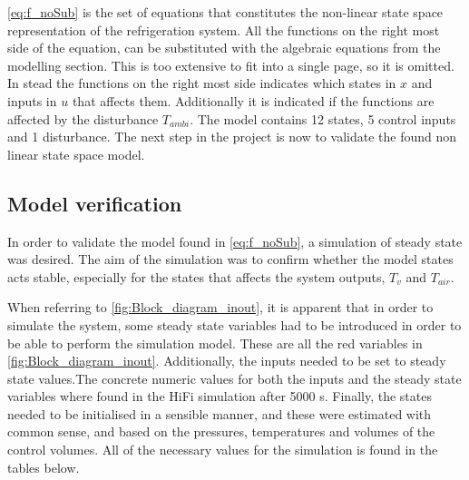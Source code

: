 \cref{eq:f_noSub} is the set of equations that constitutes the non-linear state space representation of the refrigeration system. All the functions on the right most side of the equation, can be substituted with the algebraic equations from the modelling section. This is too extensive to fit into a single page, so it is omitted. In stead the functions on the right most side indicates which states in $ x $ and inputs in $ u $ that affects them. Additionally it is indicated if the functions are affected by the disturbance $ T_{ambi} $. The model contains 12 states, 5 control inputs and 1 disturbance. The next step in the project is now to validate the found non linear state space model.

\newpage
\subsection{Model verification}\label{sec:model-verification}
In order to validate the model found in \cref{eq:f_noSub}, a simulation of steady state was desired. The aim of the simulation was to confirm whether the model states acts stable, especially for the states that affects the system outputs, $T_v$ and $T_{air}$.

When referring to \cref{fig:Block_diagram_inout}, it is apparent that in order to simulate the system, some steady state variables had to be introduced in order to be able to perform the simulation model. These are all the red variables in \cref{fig:Block_diagram_inout}. Additionally, the inputs needed to be set to steady state values.The concrete numeric values for both the inputs and the steady state variables where found in the HiFi simulation after 5000 s. Finally, the states needed to be initialised in a sensible manner, and these were estimated with common sense, and based on the pressures, temperatures and volumes of the control volumes. All of the necessary values for the simulation is found in the tables below. \\


